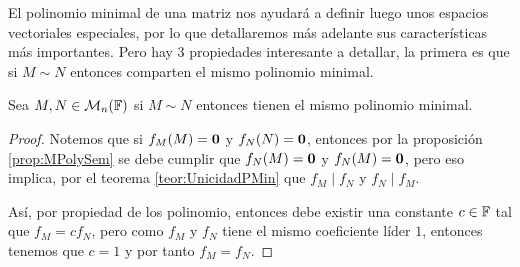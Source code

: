 El polinomio minimal de una matriz nos ayudará a definir luego unos espacios vectoriales especiales, por lo que detallaremos más adelante sus características más importantes. Pero hay 3 propiedades interesante a detallar, la primera es que si $M \sim N$ entonces comparten el mismo polinomio minimal.

\begin{prop}
  Sea $M,N \in \mathcal{M}_n(\mathbb{F})$ si $M \sim N$ entonces tienen el mismo polinomio minimal.
\end{prop}
\begin{proof}
  Notemos que si $f_M(M) = \mathbf{0}$ y $f_N(N) = \mathbf{0}$, entonces por la proposición \ref{prop:MPolySem} se debe cumplir que $f_N(M) = \mathbf{0}$ y $f_N(M) = \mathbf{0}$, pero eso implica, por el teorema \ref{teor:UnicidadPMin} que $f_M \mid f_N$ y $f_N \mid f_M$.

  Así, por propiedad de los polinomio, entonces debe existir una constante $c \in \mathbb{F}$ tal que $f_M = c f_N$, pero como $f_M$ y $f_N$ tiene el mismo coeficiente líder $1$, entonces tenemos que $c = 1$ y por tanto $f_M = f_N$.
\end{proof}